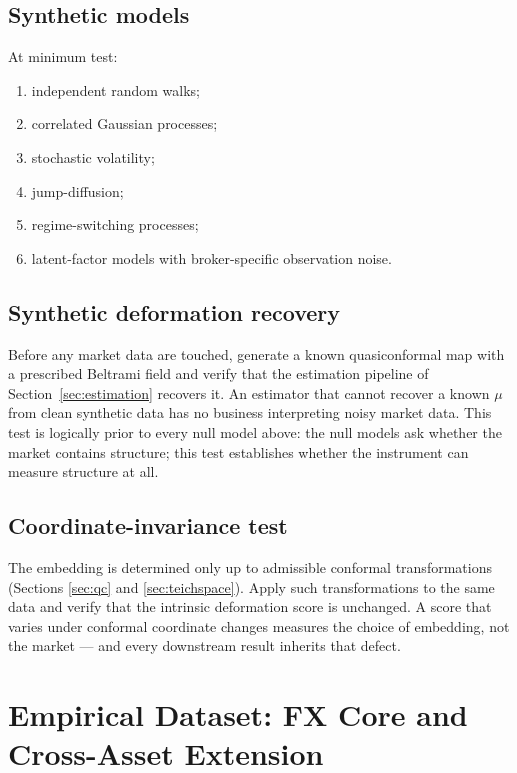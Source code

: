 \documentclass[11pt,a4paper]{article}
\numberwithin{equation}{section}
\begin{document}
\subsection{Synthetic models}
At minimum test:
\begin{enumerate}
\item independent random walks;
\item correlated Gaussian processes;
\item stochastic volatility;
\item jump-diffusion;
\item regime-switching processes;
\item latent-factor models with broker-specific observation noise.
\end{enumerate}

\subsection{Synthetic deformation recovery}
Before any market data are touched, generate a known quasiconformal
map with a prescribed Beltrami field and verify that the estimation
pipeline of Section~\ref{sec:estimation} recovers it. An estimator
that cannot recover a known $\mu$ from clean synthetic data has no
business interpreting noisy market data. This test is logically
prior to every null model above: the null models ask whether the
market contains structure; this test establishes whether the
instrument can measure structure at all.

\subsection{Coordinate-invariance test}
The embedding is determined only up to admissible conformal
transformations (Sections \ref{sec:qc} and \ref{sec:teichspace}).
Apply such transformations to the same data and verify that the
intrinsic deformation score is unchanged. A score that varies under
conformal coordinate changes measures the choice of embedding, not
the market --- and every downstream result inherits that defect.

\section{Empirical Dataset: FX Core and Cross-Asset Extension}
\label{sec:dataset}
\end{document}
